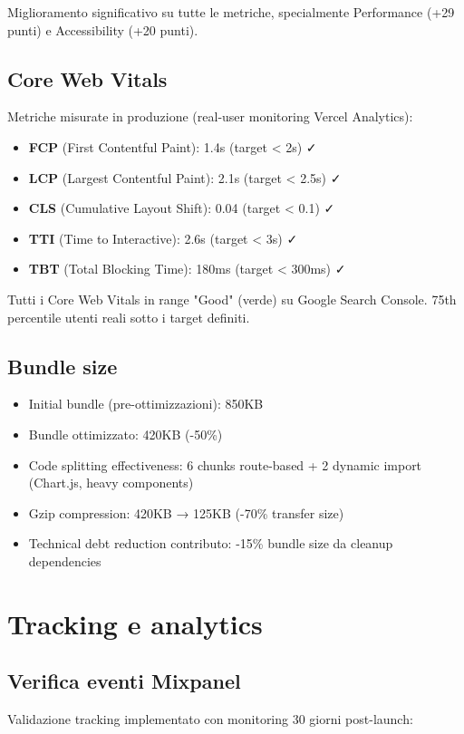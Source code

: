 Miglioramento significativo su tutte le metriche, specialmente 
Performance (+29 punti) e Accessibility (+20 punti).

\subsection{Core Web Vitals}
Metriche misurate in produzione (real-user monitoring Vercel Analytics):

\begin{itemize}
  \item \textbf{FCP} (First Contentful Paint): 1.4s (target < 2s) ✓
  \item \textbf{LCP} (Largest Contentful Paint): 2.1s (target < 2.5s) ✓
  \item \textbf{CLS} (Cumulative Layout Shift): 0.04 (target < 0.1) ✓
  \item \textbf{TTI} (Time to Interactive): 2.6s (target < 3s) ✓
  \item \textbf{TBT} (Total Blocking Time): 180ms (target < 300ms) ✓
\end{itemize}

Tutti i Core Web Vitals in range "Good" (verde) su Google Search Console. 
75th percentile utenti reali sotto i target definiti.

\subsection{Bundle size}
\begin{itemize}
  \item Initial bundle (pre-ottimizzazioni): 850KB
  \item Bundle ottimizzato: 420KB (-50\%)
  \item Code splitting effectiveness: 6 chunks route-based + 2 dynamic 
        import (Chart.js, heavy components)
  \item Gzip compression: 420KB → 125KB (-70\% transfer size)
  \item Technical debt reduction contributo: -15\% bundle size da 
        cleanup dependencies
\end{itemize}

\section{Tracking e analytics}
\subsection{Verifica eventi Mixpanel}
Validazione tracking implementato con monitoring 30 giorni post-launch:


